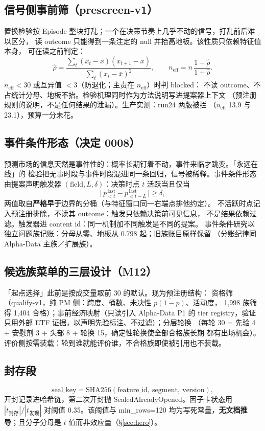 \documentclass[11pt]{ctexart}
\begin{document}
\subsection{信号侧事前筛（prescreen-v1）}
置换检验按 Episode 整块打乱；一个在决策节奏上几乎不动的信号，打乱前后难以区分，
读 outcome 只能得到一条注定的 null 并抬高地板。该性质只依赖特征值本身，
可在读之前判定：
\[ \hat\rho=\frac{\sum_t (x_t-\bar x)(x_{t+1}-\bar x)}{\sum_t (x_t-\bar x)^2},\qquad
   n_{\mathrm{eff}}=n\,\frac{1-\hat\rho}{1+\hat\rho}. \]
$n_{\mathrm{eff}}<30$ 或互异值 $<3$（防退化；主责在 $n_{\mathrm{eff}}$）时判 blocked：
不读 outcome、不占统计分母、地板不抬。检验机理同时作为方法说明写进提案器上下文
（预注册规则的说明，不是任何结果的泄漏）。生产实测：run24 两版被拦
（$n_{\mathrm{eff}}$ 13.9 与 23.1），预算一分未花。

\subsection{事件条件形态（决定 0008）}
预测市场的信息天然是事件性的：概率长期钉着不动，事件来临才跳变。「永远在线」的
检验把无事时段与事件时段混进同一条回归，信号被稀释。事件条件形态由提案声明触发器
$(\text{field}, L, \delta)$：决策时点 $t$ 活跃当且仅当
\[ \bigl|\,p^{\,\text{last}}_{<t} - p^{\,\text{last}}_{<t-L}\,\bigr| \ge \delta, \]
两值取自\textbf{严格早于}边界的分桶（与特征窗口同一右端点排他约定）。
不活跃时点记入预注册排除，不读其 outcome：触发只依赖决策前可见信息，
不是结果依赖过滤。触发器进 content id：同一机制加不同触发是不同的提案。
事件条件研究以独立问题族记账：分母从零、地板从 $0.798$ 起；旧族账目原样保留
（分账纪律同 Alpha-Data 主族／扩展族）。

\subsection{候选族菜单的三层设计（M12）}
「起点选择」此前是按成交量取前 30 的默认。现为预注册结构：
资格筛（qualify-v1，纯 PM 侧：跨度、桶数、未决性 $\overline{p(1-p)}$、活动度，
1{,}998 族筛得 1{,}404 合格）；事前经济映射（只读引入 Alpha-Data P1 的 tier
registry，验证只用外部 ETF 证据，以声明先验标注、不过滤）；分层轮换
（每轮 30 = 先验 4 + 安慰剂 3 + 头部 8 + 轮换 15，确定性轮换使全部合格族长期
都有出场机会）。评价侧按需装载：轮到谁就能评价谁，不合格族即使被引用也不装载。

\subsection{封存段}
\[ \text{seal\_key}=\mathrm{SHA256}(\text{feature\_id},\ \text{segment},\ \text{version}), \]
开封记录进哈希链，第二次开封抛 SealedAlreadyOpened。因子卡状态用
$|t_{\text{封存}}|/|t_{\text{发现}}|$ 对阈值 0.35。该阈值与 min\_rows=120
均为写死常量，\textbf{无文档推导}；且分子分母是 $t$ 值而非效应量（\S\ref{sec:hero}）。
\end{document}
